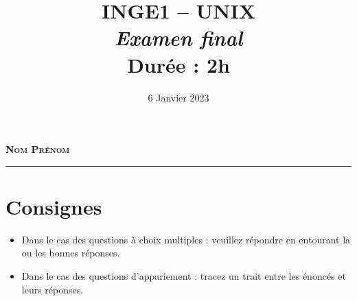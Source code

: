 \documentclass[11pt,a4paper]{article}
\title{\textsc{INGE1 -- UNIX}\\
    \emph{Examen final} \\
    Durée : 2h
}
\date{6 Janvier 2023}
\begin{document}
\maketitle

\thispagestyle{empty}
\begin{figure}[!h]
    \centering
\end{figure}

\vfill
{\noindent\Large \textbf{\textsc{Nom Prénom}}}\\[1cm]
\rule{0.8\textwidth}{1pt}

\vfill
\noindent{}
\newpage

\section*{Consignes}
\begin{itemize}
    \item Dans le cas des questions à choix multiples : veuillez répondre en entourant la ou les bonnes réponses. 
    \item Dans le cas des questions d'appariement : tracez un trait entre les énoncés et leurs réponses.
\end{itemize}
\end{document}
